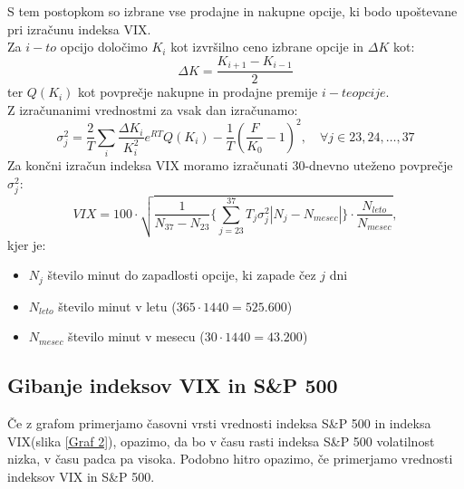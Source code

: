 \documentclass[12pt,a4paper]{amsart}
\theoremstyle{definition} %
\theoremstyle{plain} %
\begin{document}
S tem postopkom so izbrane vse prodajne in nakupne opcije, ki bodo upoštevane pri izračunu indeksa VIX.\\

Za $i-to$ opcijo določimo $K_i$ kot izvršilno ceno izbrane opcije in $\Delta K$ kot:
$$
\Delta K = \frac{K_{i+1} - K_{i-1}}{2}
$$
ter $Q(K_i)$ kot povprečje nakupne in prodajne premije $i-te opcije$.\\

Z izračunanimi vrednostmi za vsak dan izračunamo:
$$
\sigma_j^2 = \frac{2}{T}\sum_{i}{}\frac{\Delta K_i}{K_i^2}e^{RT}Q(K_i) - \frac{1}{T}(\frac{F}{K_0} - 1)^2, \quad \forall j \in {23, 24, \dots, 37}
$$
Za končni izračun indeksa VIX moramo izračunati 30-dnevno uteženo povprečje $\sigma_j^2$:
$$
VIX = 100 \cdot \sqrt{\frac{1}{N_{37}-N_{23}}\Bigg\{ \sum_{j=23}^{37}T_j\sigma_j^2\left\lvert N_j - N_{mesec}\right\rvert \Bigg\}\cdot \frac{N_{leto}}{N_{mesec}}},
$$
kjer je:
\begin{itemize}
\item $N_j$ število minut do zapadlosti opcije, ki zapade čez $j$ dni
\item $N_{leto}$ število minut v letu ($365\cdot1440=525.600$)
\item $N_{mesec}$ število minut v mesecu ($30\cdot1440=43.200$)
\end{itemize}
\newpage
\subsection{Gibanje indeksov VIX in S\&P 500}
Če z grafom primerjamo časovni vrsti vrednosti indeksa S\&P 500 in indeksa VIX(slika \ref{Graf 2}), opazimo, da bo v času rasti indeksa S\&P 500 volatilnost nizka, v času padca pa visoka. Podobno hitro opazimo, če primerjamo vrednosti indeksov VIX in S\&P 500.\
\end{document}

